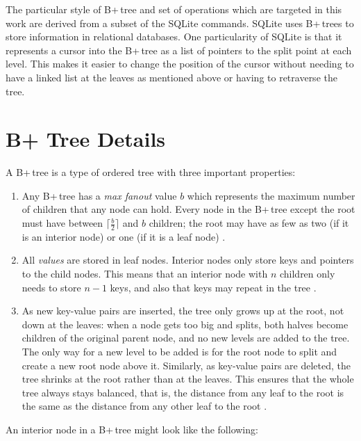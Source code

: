 \documentclass[a4paper,12pt]{article}
\begin{document}
The particular style of B+\,tree and set of operations which are targeted in this work are derived from a subset of the SQLite commands. SQLite uses B+\,trees to store information in relational databases. One particularity of SQLite is that it represents a cursor into the B+\,tree as a list of pointers to the split point at each level. This makes it easier to change the position of the cursor without needing to have a linked list at the leaves as mentioned above or having to retraverse the tree.

\clearpage

\section{B+ Tree Details} \label{sec:b+tree}

A B+\,tree is a type of ordered tree with three important properties:

\begin{enumerate}
\item Any B+\,tree has a \textit{max fanout} value $b$ which represents the maximum number of children that any node can hold. Every node in the B+\,tree except the root must have between $\lceil \frac{b}{2} \rceil$ and $b$ children; the root may have as few as two (if it is an interior node) or one (if it is a leaf node) \cite{elmasri_navathe_2011}.

\item All \textit{values} are stored in leaf nodes. Interior nodes only store keys and pointers to the child nodes. This means that an interior node with $n$ children only needs to store $n-1$ keys, and also that keys may repeat in the tree \cite{elmasri_navathe_2011}.

\item As new key-value pairs are inserted, the tree only grows up at the root, not down at the leaves: when a node gets too big and splits, both halves become children of the original parent node, and no new levels are added to the tree. The only way for a new level to be added is for the root node to split and create a new root node above it. Similarly, as key-value pairs are deleted, the tree shrinks at the root rather than at the leaves. This ensures that the whole tree always stays balanced, that is, the distance from any leaf to the root is the same as the distance from any other leaf to the root \cite{elmasri_navathe_2011}.
\end{enumerate}

An interior node in a B+\,tree might look like the following:
\end{document}
